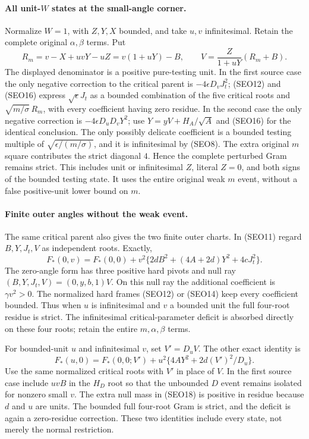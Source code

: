 \paragraph{All unit-$W$ states at the small-angle corner.}
Normalize $W=1$, with $Z,Y,X$ bounded, and take $u,v$ infinitesimal.
Retain the complete original $\alpha,\beta$ terms. Put
\[
 R_m=v-X+uvY-uZ=v(1+uY)-B,\qquad
 V=\frac{Z}{1+uY}(R_m+B).                        \tag{SEO16}
\]
The displayed denominator is a positive pure-testing unit.
In the first source case the only negative correction to the
critical parent is $-4\epsilon D_vJ_t^2$; (SEO12) and (SEO16)
express $\sqrt\epsilon J_t$ as a bounded combination of the five
critical roots and $\sqrt{m/\sigma}\,R_m$, with every coefficient
having zero residue. In the second case the only negative
correction is $-4\epsilon D_uD_vY^2$; use
$Y=yV+H_A/\sqrt A$ and (SEO16) for the identical conclusion.
The only possibly delicate coefficient is a bounded testing
multiple of $\sqrt{\epsilon/(m/\sigma)}$, and it is infinitesimal
by (SEO8). The extra original $m$ square contributes the strict
diagonal $4$. Hence the complete perturbed Gram remains strict.
This includes unit or infinitesimal $Z$, literal $Z=0$, and both
signs of the bounded testing state. It uses the entire original
weak $m$ event, without a false positive-unit lower bound on $m$.

\paragraph{Finite outer angles without the weak event.}
The same critical parent also gives the two finite outer charts.
In (SEO11) regard $B,Y,J_t,V$ as independent roots. Exactly,
\[
 F_*(0,v)=F_*(0,0)
       +v^2\{2dB^2+(4A+2d)Y^2+4cJ_t^2\}.       \tag{SEO17}
\]
The zero-angle form has three positive hard pivots and null ray
$(B,Y,J_t,V)=(0,y,b,1)V$. On this null ray the additional
coefficient is $\gamma v^2>0$. The normalized hard frames
(SEO12) or (SEO14) keep every coefficient bounded. Thus when
$u$ is infinitesimal and $v$ a bounded unit the full four-root
residue is strict. The infinitesimal critical-parameter deficit
is absorbed directly on these four roots; retain the entire
$m,\alpha,\beta$ terms.

For bounded-unit $u$ and infinitesimal $v$, set $V'=D_uV$.
The other exact identity is
\[
 F_*(u,0)=F_*(0,0;V')
        +u^2\{4AY^2+2d(V')^2/D_u\}.             \tag{SEO18}
\]
Use the same normalized critical roots with $V'$ in place of $V$.
In the first source case include $uvB$ in the $H_D$ root so that
the unbounded $D$ event remains isolated for nonzero small $v$.
The extra null mass in (SEO18) is positive in residue because
$d$ and $u$ are units. The bounded full four-root Gram is strict,
and the deficit is again a zero-residue correction. These two
identities include every state, not merely the normal restriction.

